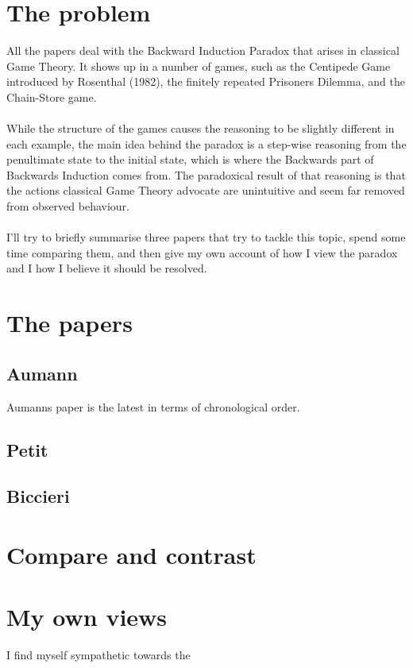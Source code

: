 \documentclass{article}
\begin{document}
\section{The problem}
All the papers deal with the Backward Induction Paradox that arises in classical Game Theory. It shows up in a number of games, such as the Centipede Game introduced by Rosenthal (1982), the finitely repeated Prisoners Dilemma, and the Chain-Store game.
\\
\\
While the structure of the games causes the reasoning to be slightly different in each example, the main idea behind the paradox is a step-wise reasoning from the penultimate state to the initial state, which is where the Backwards part of Backwards Induction comes from. The paradoxical result of that reasoning is that the actions classical Game Theory advocate are unintuitive and seem far removed from observed behaviour.
\\
\\
I'll try to briefly summarise three papers that try to tackle this topic, spend some time comparing them, and then give my own account of how I view the paradox and I how I believe it should be resolved. 

\section{The papers}
\subsection{Aumann}
Aumanns paper is the latest in terms of chronological order. 
\subsection{Petit}
\subsection{Biccieri}

\section{Compare and contrast}

\section{My own views}
I find myself sympathetic towards the
\end{document}
